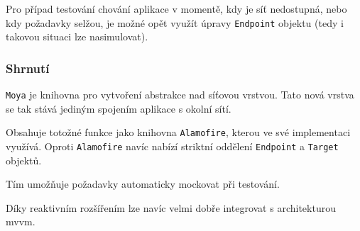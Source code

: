 Pro případ testování chování aplikace v momentě, kdy je síť nedostupná, nebo kdy požadavky selžou, je možné opět využít úpravy \texttt{Endpoint} objektu (tedy i takovou situaci lze nasimulovat).

\subsubsection*{Shrnutí}

\texttt{Moya} je knihovna pro vytvoření abstrakce nad síťovou vrstvou.
Tato nová vrstva se tak stává jediným spojením aplikace s okolní sítí.

Obsahuje totožné funkce jako knihovna \texttt{Alamofire}, kterou ve své implementaci využívá.
Oproti \texttt{Alamofire} navíc nabízí striktní oddělení \texttt{Endpoint} a \texttt{Target} objektů.

Tím umožňuje požadavky automaticky mockovat při testování.

Díky reaktivním rozšířením lze navíc velmi dobře integrovat s architekturou \acrshort{mvvm}.